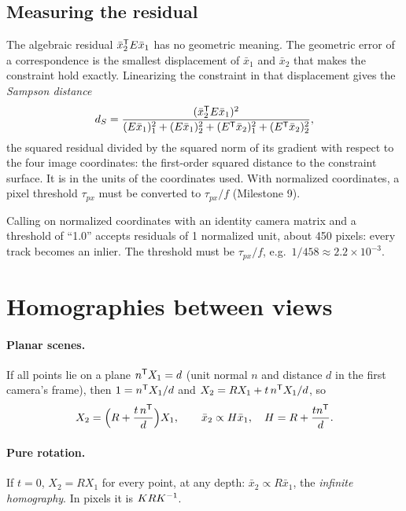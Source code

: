 \subsection{Measuring the residual}

The algebraic residual $\bar x_2^{\mathsf{T}} E\bar x_1$ has no geometric meaning. The geometric error of a correspondence is the smallest displacement of $\bar x_1$ and $\bar x_2$ that
makes the constraint hold exactly. Linearizing the constraint in that displacement gives the \emph{Sampson distance}
\begin{equation}
  d_S = \frac{(\bar x_2^{\mathsf{T}} E\bar x_1)^2}{(E\bar x_1)_1^2 + (E\bar x_1)_2^2 + (E^{\mathsf{T}}\bar x_2)_1^2 + (E^{\mathsf{T}}\bar x_2)_2^2},
\end{equation}
the squared residual divided by the squared norm of its gradient with respect to the four image coordinates: the first-order squared distance to the constraint
surface. It is in the units of the coordinates used. With normalized coordinates, a pixel threshold $\tau_{px}$ must be converted to $\tau_{px}/f$ (Milestone 9).

\begin{pitfall}
Calling  on normalized coordinates with an identity camera matrix and a threshold of ``1.0'' accepts residuals of 1 normalized unit, about
450 pixels: every track becomes an inlier. The threshold must be $\tau_{px}/f$, e.g.\ $1/458 \approx 2.2\times10^{-3}$.
\end{pitfall}

\section{Homographies between views}
\label{sec:homographies}

\paragraph{Planar scenes.} If all points lie on a plane $n^{\mathsf{T}} X_1 = d$ (unit normal $n$ and distance $d$ in the first camera's frame), then $1 = n^{\mathsf{T}} X_1/d$ and
$X_2 = RX_1 + t\,n^{\mathsf{T}} X_1/d$, so
\begin{equation}
  X_2 = \Big(R + \frac{t\,n^{\mathsf{T}}}{d}\Big)X_1, \qquad \bar x_2 \propto H\bar x_1, \quad H = R + \frac{tn^{\mathsf{T}}}{d} .
\end{equation}
\paragraph{Pure rotation.} If $t = 0$, $X_2 = RX_1$ for every point, at any depth: $\bar x_2 \propto R\bar x_1$, the \emph{infinite homography}. In pixels it is $KRK^{-1}$.

